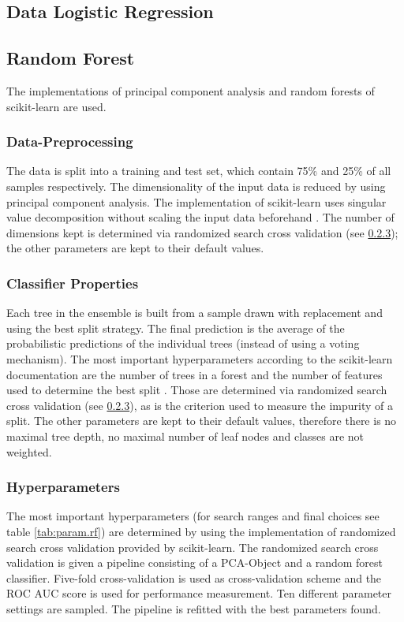 \documentclass[a4, 10 pt, conference]{ieeeconf}  %
\begin{document}
\subsection{Data Logistic Regression}

\subsection{Random Forest}
The implementations of principal component analysis and random forests of scikit-learn are used.
\subsubsection{Data-Preprocessing}
\label{subsubsection:data-processing}
The data is split into a training and test set, which contain 75\% and 25\% of all samples respectively. The dimensionality of the input data is reduced by using principal component analysis. The implementation of scikit-learn uses singular value decomposition without scaling the input data beforehand \cite{sl.pca}. The number of dimensions kept is determined via randomized search cross validation (see \ref{subsubsection:hyperparameters}); the other parameters are kept to their default values.
\subsubsection{Classifier Properties}
\label{subsubsection:classifier-properties}
Each tree in the ensemble is built from a sample drawn with replacement and using the best split strategy. The final prediction is the average of the probabilistic predictions of the individual trees (instead of using a voting mechanism). The most important hyperparameters according to the scikit-learn documentation are the number of trees in a forest and the number of features used to determine the best split \cite{sl.rf}. Those are determined via randomized search cross validation (see \ref{subsubsection:hyperparameters}), as is the criterion used to measure the impurity of a split. The other parameters are kept to their default values, therefore there is no maximal tree depth, no maximal number of leaf nodes and classes are not weighted.
\subsubsection{Hyperparameters}
\label{subsubsection:hyperparameters}
The most important hyperparameters (for search ranges and final choices see table \ref{tab:param.rf}) are determined by using the implementation of randomized search cross validation provided by scikit-learn. The randomized search cross validation is given a pipeline consisting of a PCA-Object and a random forest classifier. Five-fold cross-validation is used as cross-validation scheme and the ROC AUC score is used for performance measurement. Ten different parameter settings are sampled. The pipeline is refitted with the best parameters found.
\end{document}
